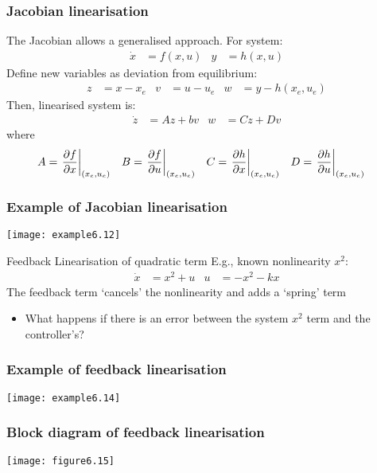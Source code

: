 \documentclass{beamer-control}
\begin{document}
\begin{frame}
\frametitle{Jacobian linearisation}
The Jacobian allows a generalised approach. For system:
\begin{align}
\dot x &= f(x,u) & y &= h(x,u)
\end{align}
Define new variables as deviation from equilibrium:
\begin{align}
z &= x - x_e & v &= u - u_e & w&= y-h(x_e,u_e)
\end{align}
Then, linearised system is:
\begin{align}
\dot z &= Az+bv & w &= Cz + Dv
\end{align}
where
\begin{align}
A &= \left.\frac{\partial f}{\partial x}\right|_{(x_e,u_e)} &
B &= \left.\frac{\partial f}{\partial u}\right|_{(x_e,u_e)} &
C &= \left.\frac{\partial h}{\partial x}\right|_{(x_e,u_e)} &
D &= \left.\frac{\partial h}{\partial u}\right|_{(x_e,u_e)}
\end{align}
\end{frame}

\begin{frame}
\frametitle{Example of Jacobian linearisation}
\centering

\texttt{[image: example6.12]}

\end{frame}


\begin{frame}{Feedback Linearisation of quadratic term}
E.g., known nonlinearity $x^2$:
\begin{align}
\dot x &= x^2 + u &
u &= -x^2 - kx
\end{align}
The feedback term `cancels' the nonlinearity and adds a `spring' term
\begin{itemize}
\item
What happens if there is an error between the system $x^2$ term and the controller's?
\end{itemize}
\end{frame}

\begin{frame}
\frametitle{Example of feedback linearisation}
\centering

\texttt{[image: example6.14]}

\end{frame}

\begin{frame}
\frametitle{Block diagram of feedback linearisation}
\centering

\texttt{[image: figure6.15]}

\end{frame}
\end{document}
